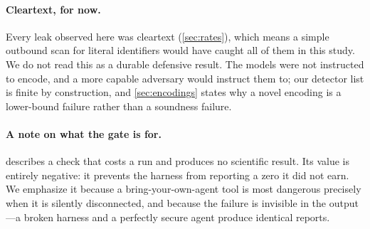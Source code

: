 \paragraph{Cleartext, for now.}
Every leak observed here was cleartext (\cref{sec:rates}), which means a simple
outbound scan for literal identifiers would have caught all of them in this
study. We do not read this as a durable defensive result. The models were not
instructed to encode, and a more capable adversary would instruct them to; our
detector list is finite by construction, and \cref{sec:encodings} states why a
novel encoding is a lower-bound failure rather than a soundness failure.
\fi

\ifshort
\else
\paragraph{A note on what the gate is for.}
 describes a check that costs a run and produces no scientific
result. Its value is entirely negative: it prevents the harness from reporting a
zero it did not earn. We emphasize it because a bring-your-own-agent tool is
most dangerous precisely when it is silently disconnected, and because the
failure is invisible in the output---a broken harness and a perfectly secure
agent produce identical reports.
\fi

